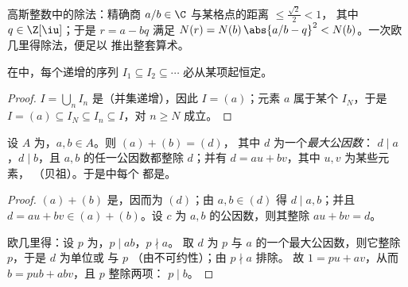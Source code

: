 \begin{omfigure}

{\small 高斯整数中的除法：精确商
$a/b \in \C$ 与某格点的距离 $\leq \frac{\sqrt2}{2} < 1$，
其中 $q \in \Z[\iu]$；于是 $r = a - bq$ 满足 $N(r) =
N(b)\,\abs{a/b - q}^2 < N(b)$。一次欧几里得除法，便足以
推出整套算术。}
\end{omfigure}

\begin{lemma}[主理想的升链]
\label{lem:b3:rings:acc}
在中，每个递增的序列 $I_1 \subseteq I_2
\subseteq \cdots$ 必从某项起恒定。
\end{lemma}

\begin{proof}
$I = \bigcup_n I_n$ 是（并集递增），因此 $I =
(a)$；元素 $a$ 属于某个 $I_N$，于是 $I = (a)
\subseteq I_N \subseteq I_n \subseteq I$，对 $n \geq N$ 成立。
\end{proof}

\begin{lemma}[贝祖；欧几里得引理]\label{lem:b3:rings:bezout}
设 $A$ 为，$a, b \in A$。则 $(a) + (b) = (d)$，
其中 $d$ 为一个\emph{最大公因数}：
$d \mid a$，$d \mid b$，且 $a,
b$ 的任一公因数都整除 $d$；并有 $d = au + bv$，其中 $u, v$ 为某些元素，
（贝祖）。于是中每个
都是。
\end{lemma}

\begin{proof}
$(a) + (b)$ 是，因而为 $(d)$；由 $a, b \in (d)$ 得 $d \mid
a, b$；并且 $d = au + bv \in (a) + (b)$。设 $c$ 为
$a, b$ 的公因数，则其整除 $au + bv = d$。

欧几里得：设 $p$ 为，$p \mid ab$，$p \nmid a$。
取 $d$ 为 $p$ 与 $a$ 的一个最大公因数，则它整除 $p$，于是 $d$ 为单位或
与 $p$ （由不可约性）；由 $p \nmid a$ 排除。
故 $1 = pu + av$，从而 $b = pub + abv$，且 $p$ 整除两项：
$p \mid b$。
\end{proof}

